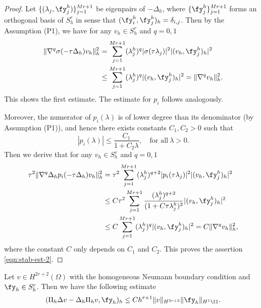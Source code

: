 \begin{proof}
Let $\{(\lambda_j, \fy_j^h)\}_{j=1}^{Mr+1}$ be eigenpairs of $-\Delta_h$, where $\{\fy_j^h\}_{j=1}^{Mr+1}$
forms an orthogonal basis of $S_h^r$
in sense that $ (\fy_i^h,\fy_j^h)_h = \delta_{i,j} $.
Then by the Assumption (P1),
we have for any $v_h \in S_h^r$ and $q=0,1$
\begin{align*}
 \| \nabla^q \sigma(-\tau \Delta_h) v_h \|_h^2 &=  \sum_{j=1}^{Mr+1}(\lambda_j^h)^q|\sigma(\tau\lambda_j)|^2 |(v_h , \fy_j^h)_h|^2\\
& \le \sum_{j=1}^{Mr+1} (\lambda_j^h)^q  |(v_h , \fy_j^h)_h|^2 = \| \nabla^q  v_h \|_h^2.
 \end{align*}
This shows the first estimate. The estimate for $p_i$ follows analogously.

Moreover, the numerator of $p_i(\lambda)$
is of lower degree than its denominator (by Assumption (P1)),
and hence there exists  constants $C_1, C_2>0$ such that
$$  |p_i(\lambda)| \le \frac{C_1}{1+C_2\lambda},\quad \text{for all} ~\lambda>0. $$
Then we derive that  for any $v_h \in S_h^r$ and $q=0,1$
\begin{align*}
\tau^2 \|  \nabla^q \Delta_h p_i (-\tau \Delta_h) v_h \|_h^2
&= \tau^2\sum_{j=1}^{Mr+1}(\lambda_j^h)^{q+2} |p_i(\tau\lambda_j)|^2 |(v_h , \fy_j^h)_h|^2\\
& \le C\tau^2\sum_{j=1}^{Mr+1} \frac{(\lambda_j^h)^{q+2}}{(1+C\tau\lambda_j^h)^2}  |(v_h , \fy_j^h)_h|^2 \\
& \le C \sum_{j=1}^{Mr+1} (\lambda_j^h)^q  |(v_h , \fy_j^h)_h|^2 = C\| \nabla^q  v_h \|_h^2,
\end{align*}
where the constant $C$ only depends on $C_1$ and $C_2$.
This proves the assertion \eqref{eqn:stab-est-2}.
\end{proof}


\begin{lemma}\label{lem:truncation}
Let $v\in H^{2r+2}(\Omega)$ with the homogeneous Neumann boundary condition
and $\fy_h\in S_h^r$. Then we have the following estimate
$$ (\Pi_h \Delta v - \Delta_h \Pi_h v, \fy_h )_h \le Ch^{r+1} \| v \|_{H^{2r+2}} \|\fy_h \|_{H^1\II}. $$%
\end{lemma}

